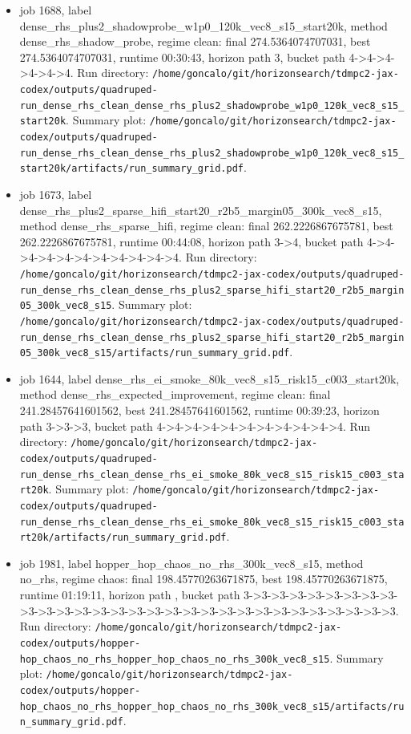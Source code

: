 \begin{itemize}
\item job 1688, label dense\_rhs\_plus2\_shadowprobe\_w1p0\_120k\_vec8\_s15\_start20k, method dense\_rhs\_shadow\_probe, regime clean: final 274.5364074707031, best 274.5364074707031, runtime 00:30:43, horizon path 3, bucket path 4->4->4->4->4->4. Run directory: \texttt{/home/goncalo/git/horizonsearch/tdmpc2-jax-codex/outputs/quadruped-run\_dense\_rhs\_clean\_dense\_rhs\_plus2\_shadowprobe\_w1p0\_120k\_vec8\_s15\_start20k}. Summary plot: \texttt{/home/goncalo/git/horizonsearch/tdmpc2-jax-codex/outputs/quadruped-run\_dense\_rhs\_clean\_dense\_rhs\_plus2\_shadowprobe\_w1p0\_120k\_vec8\_s15\_start20k/artifacts/run\_summary\_grid.pdf}.
\item job 1673, label dense\_rhs\_plus2\_sparse\_hifi\_start20\_r2b5\_margin05\_300k\_vec8\_s15, method dense\_rhs\_sparse\_hifi, regime clean: final 262.2226867675781, best 262.2226867675781, runtime 00:44:08, horizon path 3->4, bucket path 4->4->4->4->4->4->4->4->4->4->4. Run directory: \texttt{/home/goncalo/git/horizonsearch/tdmpc2-jax-codex/outputs/quadruped-run\_dense\_rhs\_clean\_dense\_rhs\_plus2\_sparse\_hifi\_start20\_r2b5\_margin05\_300k\_vec8\_s15}. Summary plot: \texttt{/home/goncalo/git/horizonsearch/tdmpc2-jax-codex/outputs/quadruped-run\_dense\_rhs\_clean\_dense\_rhs\_plus2\_sparse\_hifi\_start20\_r2b5\_margin05\_300k\_vec8\_s15/artifacts/run\_summary\_grid.pdf}.
\item job 1644, label dense\_rhs\_ei\_smoke\_80k\_vec8\_s15\_risk15\_c003\_start20k, method dense\_rhs\_expected\_improvement, regime clean: final 241.28457641601562, best 241.28457641601562, runtime 00:39:23, horizon path 3->3->3, bucket path 4->4->4->4->4->4->4->4->4->4->4. Run directory: \texttt{/home/goncalo/git/horizonsearch/tdmpc2-jax-codex/outputs/quadruped-run\_dense\_rhs\_clean\_dense\_rhs\_ei\_smoke\_80k\_vec8\_s15\_risk15\_c003\_start20k}. Summary plot: \texttt{/home/goncalo/git/horizonsearch/tdmpc2-jax-codex/outputs/quadruped-run\_dense\_rhs\_clean\_dense\_rhs\_ei\_smoke\_80k\_vec8\_s15\_risk15\_c003\_start20k/artifacts/run\_summary\_grid.pdf}.
\item job 1981, label hopper\_hop\_chaos\_no\_rhs\_300k\_vec8\_s15, method no\_rhs, regime chaos: final 198.45770263671875, best 198.45770263671875, runtime 01:19:11, horizon path , bucket path 3->3->3->3->3->3->3->3->3->3->3->3->3->3->3->3->3->3->3->3->3->3->3->3->3->3->3->3->3->3. Run directory: \texttt{/home/goncalo/git/horizonsearch/tdmpc2-jax-codex/outputs/hopper-hop\_chaos\_no\_rhs\_hopper\_hop\_chaos\_no\_rhs\_300k\_vec8\_s15}. Summary plot: \texttt{/home/goncalo/git/horizonsearch/tdmpc2-jax-codex/outputs/hopper-hop\_chaos\_no\_rhs\_hopper\_hop\_chaos\_no\_rhs\_300k\_vec8\_s15/artifacts/run\_summary\_grid.pdf}.

\end{itemize}
